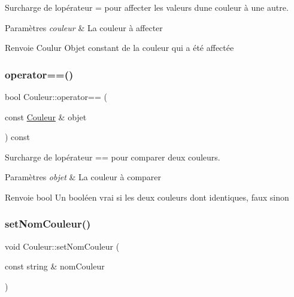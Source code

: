 Surcharge de l\textquotesingle{}opérateur = pour affecter les valeurs d\textquotesingle{}une couleur à une autre. 


\begin{DoxyParams}{Paramètres}
{\em couleur} & La couleur à affecter \\
\hline
\end{DoxyParams}
\begin{DoxyReturn}{Renvoie}
Coulur Objet constant de la couleur qui a été affectée 
\end{DoxyReturn}
\mbox{\label{class_couleur_a159c6c550e8855d6a44765ab5e0b0de8}} 
\subsubsection{\texorpdfstring{operator==()}{operator==()}}
{\footnotesize\ttfamily bool Couleur\+::operator== (\begin{DoxyParamCaption}\item[{const \mbox{\hyperlink{class_couleur}{Couleur}} \&}]{objet }\end{DoxyParamCaption}) const}



Surcharge de l\textquotesingle{}opérateur == pour comparer deux couleurs. 


\begin{DoxyParams}{Paramètres}
{\em objet} & La couleur à comparer \\
\hline
\end{DoxyParams}
\begin{DoxyReturn}{Renvoie}
bool Un booléen vrai si les deux couleurs dont identiques, faux sinon 
\end{DoxyReturn}
\mbox{\label{class_couleur_a571f1d6faacd4ee99f0180400ccb259d}} 
\subsubsection{\texorpdfstring{setNomCouleur()}{setNomCouleur()}}
{\footnotesize\ttfamily void Couleur\+::set\+Nom\+Couleur (\begin{DoxyParamCaption}\item[{const string \&}]{nom\+Couleur }\end{DoxyParamCaption})}



